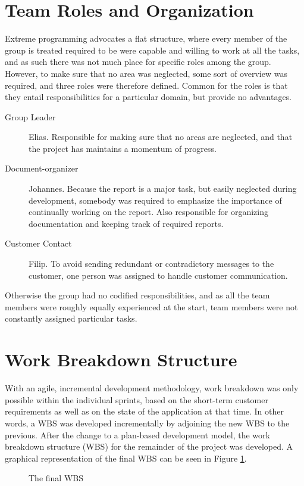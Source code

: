 \section{Team Roles and Organization}
Extreme programming advocates a flat structure, where every member of the group is treated required to be were capable and willing to work at all the tasks, and as such there was not much place for specific roles among the group. However, to make sure that no area was neglected, some sort of overview was required, and three roles were therefore defined. Common for the roles is that they entail responsibilities for a particular domain, but provide no advantages.

\begin{description}
\item[Group Leader] Elias. Responsible for making sure that no areas are neglected, and that the project has maintains a momentum of progress.
\item[Document-organizer] Johannes. Because the report is a major task, but easily neglected during development, somebody was required to emphasize the importance of continually working on the report. Also responsible for organizing documentation and keeping track of required reports.
\item[Customer Contact] Filip. To avoid sending redundant or contradictory messages to the customer, one person was assigned to handle customer communication.
\end{description}
 
Otherwise the group had no codified responsibilities, and as all the team members were roughly equally experienced at the start, team members were not constantly assigned particular tasks.
 
\section{Work Breakdown Structure}
With an agile, incremental development methodology, work breakdown was only possible within the individual sprints, based on the short-term customer requirements as well as on the state of the application at that time. In other words, a WBS was developed incrementally by adjoining the new WBS to the previous. After the change to a plan-based development model, the work breakdown structure (WBS) for the remainder of the project was developed. A graphical representation of the final WBS can be seen in Figure \ref{fig:WBS}.

\begin{figure}[p]

\setlength\fboxsep{0pt}
\setlength\fboxrule{1pt}\noindent{}

\caption{The final WBS}
\label{fig:WBS}
\end{figure}
